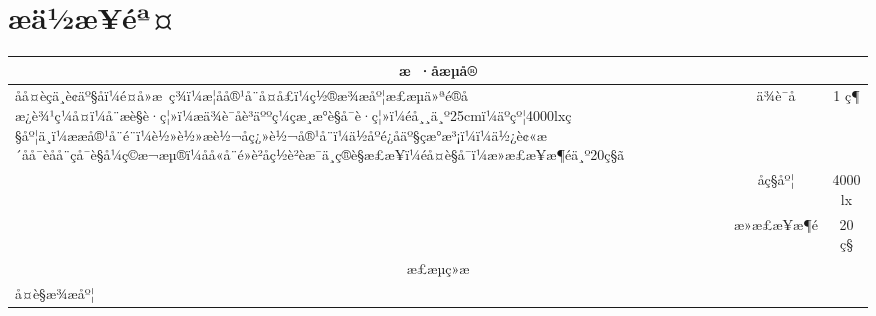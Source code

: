 \documentclass[UTF8,10pt,a4paper,fontset=fandol]{ctexart}
\newcommand{\fieldvalue}[1]{#1}
\newcommand{\handwritten}[1]{#1}
\begin{document}
\section{æä½æ­¥éª¤}

\begin{tabularx}    {\textwidth}{|X|c|c|}
\hline
\multicolumn{3}{|c|}{æ ·åæµå®}\\
\hline
åå¤èçä¸è¢äº§åï¼é¤å»æ ç­¾ï¼æ¦åå®¹å¨å¤å£ï¼ç½®æ¾æåº¦æ£æµä»ªé®åæ¿è¾¹ç¼å¤ï¼å¨æè§è·ç¦»ï¼æä¾è¯åè³äººç¼çæ¸æ°è§å¯è·ç¦»ï¼éå¸¸ä¸º25cmï¼äºçº¦4000lxç§åº¦ä¸ï¼ææå®¹å¨é¨ï¼è½»è½»æè½¬åç¿»è½¬å®¹å¨ï¼ä½åºé¿åäº§çæ°æ³¡ï¼ï¼ä½¿è¢«æ´åå¯èå­å¨çå¯è§å¼ç©æ¬æµ®ï¼åå«å¨é»è²åç½è²èæ¯ä¸ç®è§æ£æ¥ï¼éå¤è§å¯ï¼æ»æ£æ¥æ¶éä¸º20ç§ã &
ä¾è¯å &
\fieldvalue{\handwritten{1}} ç¶\\
\cline{2-3}
& åç§åº¦ &
\fieldvalue{\handwritten{4000}} lx\\
\cline{2-3}
& æ»æ£æ¥æ¶é &
\fieldvalue{\handwritten{20}} ç§\\
\hline
\multicolumn{3}{|c|}{æ£æµç»æ}\\
\hline
\multicolumn{3}{|p{0.95\textwidth}|}{
\handwritten{å¤è§æ¾æåº¦}

}
\end{tabularx}
\end{document}
